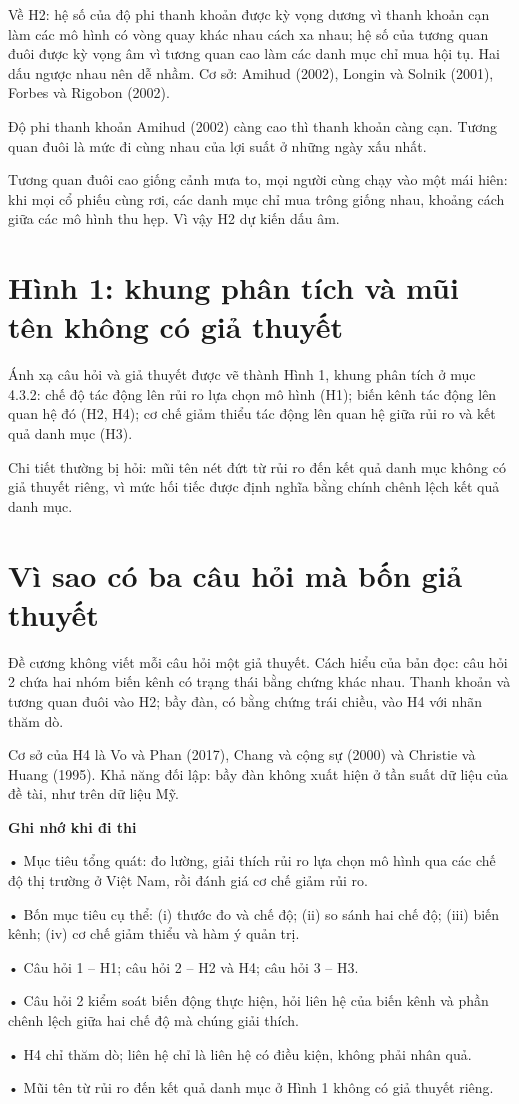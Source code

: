Về H2: hệ số của độ phi thanh khoản được kỳ vọng dương vì thanh khoản cạn làm các mô hình có vòng quay khác nhau cách xa nhau; hệ số của tương quan đuôi được kỳ vọng âm vì tương quan cao làm các danh mục chỉ mua hội tụ. Hai dấu ngược nhau nên dễ nhầm. Cơ sở: Amihud (2002), Longin và Solnik (2001), Forbes và Rigobon (2002).

Độ phi thanh khoản Amihud (2002) càng cao thì thanh khoản càng cạn. Tương quan đuôi là mức đi cùng nhau của lợi suất ở những ngày xấu nhất.

Tương quan đuôi cao giống cảnh mưa to, mọi người cùng chạy vào một mái hiên: khi mọi cổ phiếu cùng rơi, các danh mục chỉ mua trông giống nhau, khoảng cách giữa các mô hình thu hẹp. Vì vậy H2 dự kiến dấu âm.

\section{Hình 1: khung phân tích và mũi tên không có giả thuyết}

Ánh xạ câu hỏi và giả thuyết được vẽ thành Hình 1, khung phân tích ở mục 4.3.2: chế độ tác động lên rủi ro lựa chọn mô hình (H1); biến kênh tác động lên quan hệ đó (H2, H4); cơ chế giảm thiểu tác động lên quan hệ giữa rủi ro và kết quả danh mục (H3).

Chi tiết thường bị hỏi: mũi tên nét đứt từ rủi ro đến kết quả danh mục không có giả thuyết riêng, vì mức hối tiếc được định nghĩa bằng chính chênh lệch kết quả danh mục.

\section{Vì sao có ba câu hỏi mà bốn giả thuyết}

Đề cương không viết mỗi câu hỏi một giả thuyết. Cách hiểu của bản đọc: câu hỏi 2 chứa hai nhóm biến kênh có trạng thái bằng chứng khác nhau. Thanh khoản và tương quan đuôi vào H2; bầy đàn, có bằng chứng trái chiều, vào H4 với nhãn thăm dò.

Cơ sở của H4 là Vo và Phan (2017), Chang và cộng sự (2000) và Christie và Huang (1995). Khả năng đối lập: bầy đàn không xuất hiện ở tần suất dữ liệu của đề tài, như trên dữ liệu Mỹ.

\begin{tcolorbox}[breakable]
\textbf{Ghi nhớ khi đi thi}

• Mục tiêu tổng quát: đo lường, giải thích rủi ro lựa chọn mô hình qua các chế độ thị trường ở Việt Nam, rồi đánh giá cơ chế giảm rủi ro.

• Bốn mục tiêu cụ thể: (i) thước đo và chế độ; (ii) so sánh hai chế độ; (iii) biến kênh; (iv) cơ chế giảm thiểu và hàm ý quản trị.

• Câu hỏi 1 -- H1; câu hỏi 2 -- H2 và H4; câu hỏi 3 -- H3.

• Câu hỏi 2 kiểm soát biến động thực hiện, hỏi liên hệ của biến kênh và phần chênh lệch giữa hai chế độ mà chúng giải thích.

• H4 chỉ thăm dò; liên hệ chỉ là liên hệ có điều kiện, không phải nhân quả.

• Mũi tên từ rủi ro đến kết quả danh mục ở Hình 1 không có giả thuyết riêng.
\end{tcolorbox}

